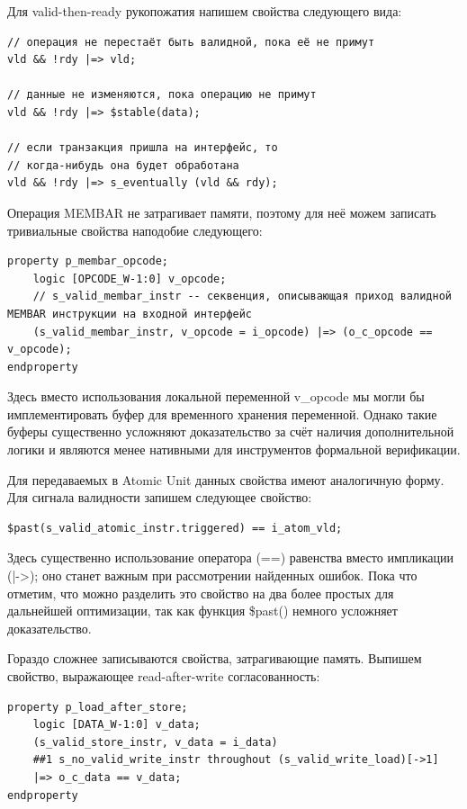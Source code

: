 Для valid-then-ready рукопожатия напишем свойства следующего вида:

\begin{lstlisting}
// операция не перестаёт быть валидной, пока её не примут
vld && !rdy |=> vld;   

// данные не изменяются, пока операцию не примут
vld && !rdy |=> $stable(data);   

// если транзакция пришла на интерфейс, то 
// когда-нибудь она будет обработана
vld && !rdy |=> s_eventually (vld && rdy);    
\end{lstlisting}

Операция MEMBAR не затрагивает памяти, поэтому для неё можем записать тривиальные свойства наподобие следующего:

\begin{lstlisting}
property p_membar_opcode;
    logic [OPCODE_W-1:0] v_opcode; 
    // s_valid_membar_instr -- секвенция, описывающая приход валидной MEMBAR инструкции на входной интерфейс
    (s_valid_membar_instr, v_opcode = i_opcode) |=> (o_c_opcode == v_opcode);
endproperty
\end{lstlisting}

Здесь вместо использования локальной переменной v\_opcode мы могли бы имплементировать буфер для временного хранения переменной. Однако такие буферы существенно усложняют доказательство за счёт наличия дополнительной логики и являются менее нативными для инструментов формальной верификации. 

Для передаваемых в Atomic Unit данных свойства имеют аналогичную форму. Для сигнала валидности запишем следующее свойство:

\begin{lstlisting}
$past(s_valid_atomic_instr.triggered) == i_atom_vld;
\end{lstlisting}

Здесь существенно использование оператора (==) равенства вместо импликации \mbox{(|->)}; оно станет важным при рассмотрении найденных ошибок. Пока что отметим, что можно разделить это свойство на два более простых для дальнейшей оптимизации, так как функция \$past() немного усложняет доказательство. 

Гораздо сложнее записываются свойства, затрагивающие память. Выпишем свойство, выражающее read-after-write согласованность:

\begin{lstlisting}
property p_load_after_store;
    logic [DATA_W-1:0] v_data;
    (s_valid_store_instr, v_data = i_data) 
    ##1 s_no_valid_write_instr throughout (s_valid_write_load)[->1]
    |=> o_c_data == v_data;
endproperty
\end{lstlisting}

